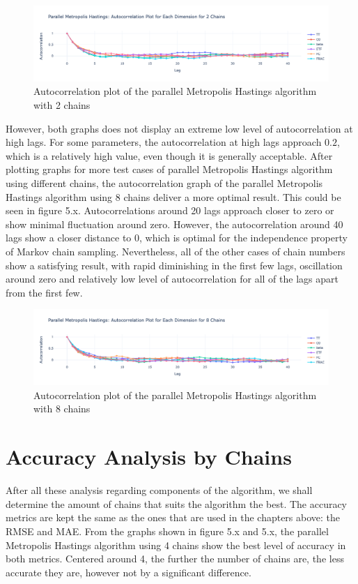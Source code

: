 \begin{figure}[H]
    \centering
    \includegraphics[width=1\textwidth]{figures/parallel_mh/Autocorrelation_2.png}
    \captionsetup{width=.8\textwidth}
    \caption{Autocorrelation plot of the parallel Metropolis Hastings algorithm with 2 chains}
    \label{fig:enter-label}
\end{figure}


However, both graphs does not display an extreme low level of autocorrelation at high lags. For some parameters, the autocorrelation at high lags approach $0.2$, which is a relatively high value, even though it is generally acceptable. After plotting graphs for more test cases of parallel Metropolis Hastings algorithm using different chains, the autocorrelation graph of the parallel Metropolis Hastings algorithm using 8 chains deliver a more optimal result. This could be seen in figure 5.x. Autocorrelations around 20 lags approach closer to zero or show minimal fluctuation around zero. However, the autocorrelation around 40 lags show a closer distance to 0, which is optimal for the independence property of Markov chain sampling. Nevertheless, all of the other cases of chain numbers show a satisfying result, with rapid diminishing in the first few lags, oscillation around zero and relatively low level of autocorrelation for all of the lags apart from the first few.


\begin{figure}[H]
    \centering
    \includegraphics[width=1\textwidth]{figures/parallel_mh/Autocorrelation_8.png}
    \captionsetup{width=.8\textwidth}
    \caption{Autocorrelation plot of the parallel Metropolis Hastings algorithm with 8 chains}
    \label{fig:enter-label}
\end{figure}


\section{Accuracy Analysis by Chains}
After all these analysis regarding components of the algorithm, we shall determine the amount of chains that suits the algorithm the best. The accuracy metrics are kept the same as the ones that are used in the chapters above: the RMSE and MAE. From the graphs shown in figure 5.x and 5.x, the parallel Metropolis Hastings algorithm using 4 chains show the best level of accuracy in both metrics. Centered around 4, the further the number of chains are, the less accurate they are, however not by a significant difference.

